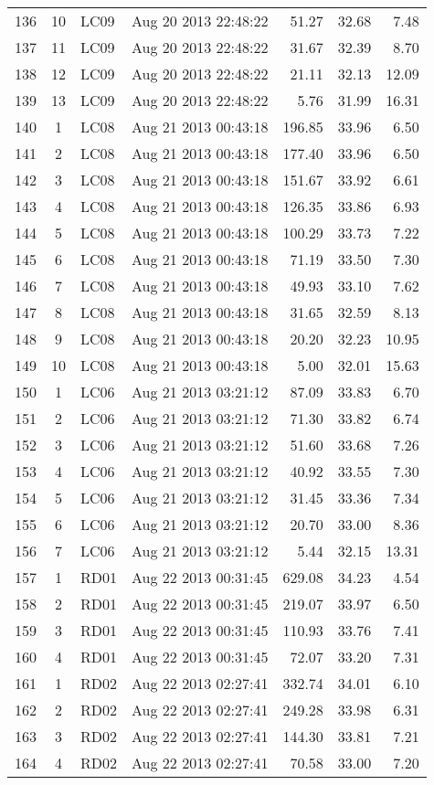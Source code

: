 \documentclass{article}
\begin{document}
\begin{longtable}{ccllrrr}
136&10&LC09&Aug 20 2013 22:48:22&51.27&32.68&7.48\\
137&11&LC09&Aug 20 2013 22:48:22&31.67&32.39&8.70\\
138&12&LC09&Aug 20 2013 22:48:22&21.11&32.13&12.09\\
139&13&LC09&Aug 20 2013 22:48:22&5.76&31.99&16.31\\
\hline 
140&1&LC08&Aug 21 2013 00:43:18&196.85&33.96&6.50\\
141&2&LC08&Aug 21 2013 00:43:18&177.40&33.96&6.50\\
142&3&LC08&Aug 21 2013 00:43:18&151.67&33.92&6.61\\
143&4&LC08&Aug 21 2013 00:43:18&126.35&33.86&6.93\\
144&5&LC08&Aug 21 2013 00:43:18&100.29&33.73&7.22\\
145&6&LC08&Aug 21 2013 00:43:18&71.19&33.50&7.30\\
146&7&LC08&Aug 21 2013 00:43:18&49.93&33.10&7.62\\
147&8&LC08&Aug 21 2013 00:43:18&31.65&32.59&8.13\\
148&9&LC08&Aug 21 2013 00:43:18&20.20&32.23&10.95\\
149&10&LC08&Aug 21 2013 00:43:18&5.00&32.01&15.63\\
\hline 
150&1&LC06&Aug 21 2013 03:21:12&87.09&33.83&6.70\\
151&2&LC06&Aug 21 2013 03:21:12&71.30&33.82&6.74\\
152&3&LC06&Aug 21 2013 03:21:12&51.60&33.68&7.26\\
153&4&LC06&Aug 21 2013 03:21:12&40.92&33.55&7.30\\
154&5&LC06&Aug 21 2013 03:21:12&31.45&33.36&7.34\\
155&6&LC06&Aug 21 2013 03:21:12&20.70&33.00&8.36\\
156&7&LC06&Aug 21 2013 03:21:12&5.44&32.15&13.31\\
\hline 
157&1&RD01&Aug 22 2013 00:31:45&629.08&34.23&4.54\\
158&2&RD01&Aug 22 2013 00:31:45&219.07&33.97&6.50\\
159&3&RD01&Aug 22 2013 00:31:45&110.93&33.76&7.41\\
160&4&RD01&Aug 22 2013 00:31:45&72.07&33.20&7.31\\
\hline 
161&1&RD02&Aug 22 2013 02:27:41&332.74&34.01&6.10\\
162&2&RD02&Aug 22 2013 02:27:41&249.28&33.98&6.31\\
163&3&RD02&Aug 22 2013 02:27:41&144.30&33.81&7.21\\
164&4&RD02&Aug 22 2013 02:27:41&70.58&33.00&7.20\\

\end{longtable}
\end{document}
